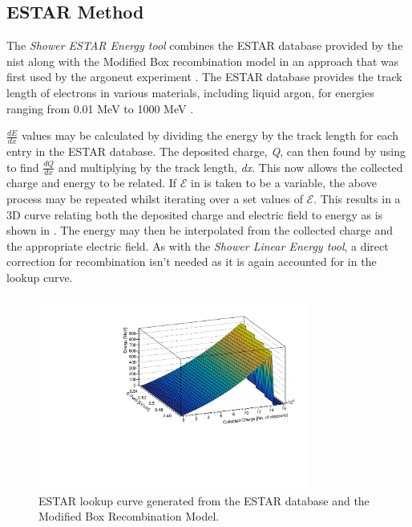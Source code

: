 \subsection{ESTAR Method}
The \textit{Shower ESTAR Energy tool} combines the ESTAR database provided by the \gls{nist} along with the Modified Box recombination model in an approach that was first used by the \Gls{argoneut} experiment \cite{ArgoNeuT_ESTAR_paper}. The ESTAR database provides the track length of electrons in various materials, including liquid argon, for energies ranging from 0.01 MeV to 1000 MeV \cite{ESTAR_Database}.

$\frac{dE}{dx}$ values may be calculated by dividing the energy by the track length for each entry in the ESTAR database. The deposited charge, \textit{Q}, can then found by using  to find $\frac{dQ}{dx}$ and multiplying by the track length, \textit{dx}. This now allows the collected charge and energy to be related. If $\mathcal{E}$ in  is taken to be a variable, the above process may be repeated whilst iterating over a set values of $\mathcal{E}$. This results in a 3D curve relating both the deposited charge and electric field to energy as is shown in . The energy may then be interpolated from the collected charge and the appropriate electric field. As with the \textit{Shower Linear Energy tool}, a direct correction for recombination isn't needed as it is again accounted for in the lookup curve. 

\begin{figure}[h!]
    \centering
    \includegraphics[width = 0.8\textwidth]{figures-chap4/ESTAR_lookup_curve.pdf}
    \caption[ESTAR lookup curve.]{ESTAR lookup curve generated from the ESTAR database and the Modified Box Recombination Model.}
    \label{fig:ESTAR lookup curve}
\end{figure}

